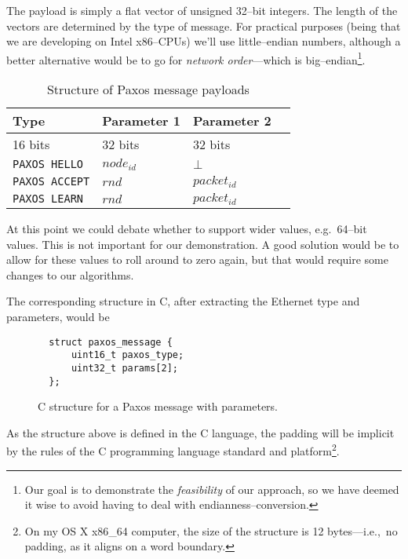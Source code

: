 The payload is simply a flat vector of unsigned 32--bit integers.  The length
of the vectors are determined by the type of message.  For practical
purposes (being that we are developing on Intel x86--CPUs) we'll use
little--endian numbers, although a better alternative would be to go for
\textit{network order}---which is big--endian\footnote{Our goal is to
demonstrate the \textit{feasibility} of our approach, so we have deemed it
wise to avoid having to deal with endianness--conversion.}.

\begin{table}[H]
  \centering
  \begin{tabular}{|l|l|l|l|}
    \hline \textbf{Type} & \textbf{Parameter 1} & \textbf{Parameter 2} \\
    \hline 16 bits & 32 bits & 32 bits \\
    \hline \texttt{PAXOS HELLO} & $node_{id}$ & $\bot$ \\
    \hline \texttt{PAXOS ACCEPT} & $rnd$ & $packet_{id}$ \\
    \hline \texttt{PAXOS LEARN} & $rnd$ & $packet_{id}$ \\
    \hline
  \end{tabular}
  \label{table:paxos.payload.structure}
  \caption{Structure of Paxos message payloads}
\end{table}

At this point we
could debate whether to support wider values, e.g.~64--bit values.
This is not important for our demonstration.  A good solution would be to
allow for these values to roll around to zero again, but that would require
some changes to our algorithms.

The corresponding structure in C, after extracting the Ethernet type and
parameters, would be

\begin{figure}[H]
  \begin{Verbatim}
  struct paxos_message {
      uint16_t paxos_type;
      uint32_t params[2];
  };
  \end{Verbatim}
  \label{struct:paxos.message}
  \caption{C structure for a Paxos message with parameters.}
\end{figure}

As the structure above is defined in the C language, the padding will be
implicit by the rules of the C programming language standard and
platform\footnote{On my OS X x86\_{}64 computer, the size of the structure
is 12 bytes---i.e.,~no padding, as it aligns on a word boundary.}.

